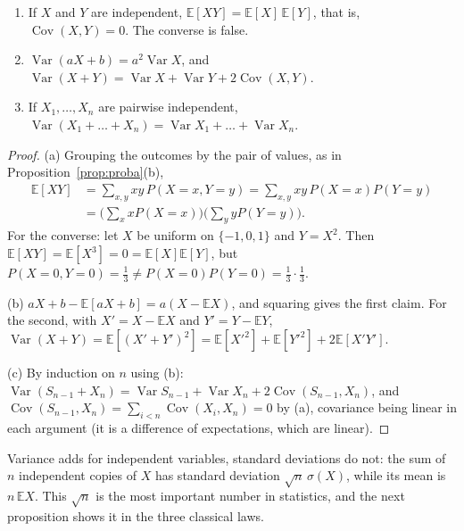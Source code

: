 \begin{proposition}\label{prop:varsum}
\begin{enumerate}[label=(\alph*)]
\item If $X$ and $Y$ are independent, $\mathbb E[XY]=\mathbb E[X]\,\mathbb E[Y]$, that is, $\operatorname{Cov}(X,Y)=0$. The converse is false.
\item $\operatorname{Var}(aX+b)=a^2\operatorname{Var}X$, and $\operatorname{Var}(X+Y)=\operatorname{Var}X+\operatorname{Var}Y+2\operatorname{Cov}(X,Y)$.
\item If $X_1,\dots,X_n$ are pairwise independent, $\operatorname{Var}(X_1+\dots+X_n)=\operatorname{Var}X_1+\dots+\operatorname{Var}X_n$.
\end{enumerate}
\end{proposition}
\begin{proof}
(a) Grouping the outcomes by the pair of values, as in Proposition~\ref{prop:proba}(b),
\[
\begin{aligned}\mathbb E[XY]&=\sum_{x,y}xy\,P(X=x,Y=y)=\sum_{x,y}xy\,P(X=x)P(Y=y)\\&=\Big(\sum_xxP(X=x)\Big)\Big(\sum_yyP(Y=y)\Big).\end{aligned}
\]
For the converse: let $X$ be uniform on $\{-1,0,1\}$ and $Y=X^2$. Then $\mathbb E[XY]=\mathbb E[X^3]=0=\mathbb E[X]\mathbb E[Y]$, but $P(X=0,Y=0)=\frac13\ne P(X=0)P(Y=0)=\frac13\cdot\frac13$.

(b) $aX+b-\mathbb E[aX+b]=a(X-\mathbb EX)$, and squaring gives the first claim. For the second, with $X'=X-\mathbb EX$ and $Y'=Y-\mathbb EY$, $\operatorname{Var}(X+Y)=\mathbb E[(X'+Y')^2]=\mathbb E[X'^2]+\mathbb E[Y'^2]+2\mathbb E[X'Y']$.

(c) By induction on $n$ using (b): $\operatorname{Var}(S_{n-1}+X_n)=\operatorname{Var}S_{n-1}+\operatorname{Var}X_n+2\operatorname{Cov}(S_{n-1},X_n)$, and $\operatorname{Cov}(S_{n-1},X_n)=\sum_{i<n}\operatorname{Cov}(X_i,X_n)=0$ by (a), covariance being linear in each argument (it is a difference of expectations, which are linear).
\end{proof}

Variance adds for independent variables, standard deviations do not: the sum of $n$ independent copies of $X$ has standard deviation $\sqrt n\,\sigma(X)$, while its mean is $n\,\mathbb E X$. This $\sqrt n$ is the most important number in statistics, and the next proposition shows it in the three classical laws.

